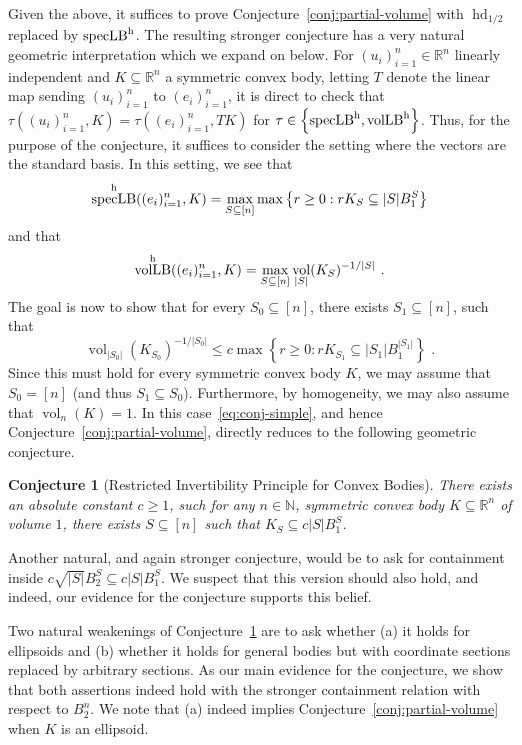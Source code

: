 \documentclass[11pt]{article}
\newtheorem{conjecture}[theorem]{Conjecture}
\newcommand{\R}{{\mathbb{R}}}
\newcommand{\N}{{\mathbb{N}}}
\newcommand{\set}[1]{\left\{ #1 \right\}}
\DeclareMathOperator{\vollb}{volLB}
\DeclareMathOperator{\hd}{hd}
\DeclareMathOperator{\vol}{vol}
\DeclareMathOperator{\speclb}{specLB}
\begin{document}
Given the above, it suffices to prove Conjecture~\ref{conj:partial-volume} with
$\hd_{1/2}$ replaced by $\speclb^{\rm h}$. The resulting stronger conjecture has a
very natural geometric interpretation which we expand on below. For
$(u_i)_{i=1}^n \in \R^n$ linearly independent and $K \subseteq \R^n$ a symmetric
convex body, letting $T$ denote the linear map sending $(u_i)_{i=1}^n$ to
$(e_i)_{i=1}^n$, it is direct to check that $\tau((u_i)_{i=1}^n,K) =
\tau((e_i)_{i=1}^n,TK)$ for $\tau \in \set{\speclb^{\rm h},\vollb^{\rm h}}$.
Thus, for the purpose of the conjecture, it suffices to consider the setting
where the vectors are the standard basis. In this setting, we see that
\[
\speclb^{\rm h}((e_i)_{i=1}^n,K) = \max_{S \subseteq [n]} \max \set{r \geq
0: r K_S \subseteq |S| B_1^S} 
\]
and that 
\[
\vollb^{\rm h}((e_i)_{i=1}^n,K) = \max_{S \subseteq [n]}
\vol_{|S|}(K_S)^{-1/|S|} \text{ .} 
\]
The goal is now to show that for every $S_0 \subseteq [n]$, there exists $S_1
\subseteq [n]$, such that 
\begin{equation}
\label{eq:conj-simple}
\vol_{|S_0|}(K_{S_0})^{-1/|S_0|} \leq c \max \set{r \geq 0: r K_{S_1} \subseteq
|S_1| B_1^{|S_1|}} \text{ .}
\end{equation}
Since this must hold for every symmetric convex body $K$, we may assume that
$S_0 = [n]$ (and thus $S_1 \subseteq S_0$). Furthermore, by homogeneity, we may
also assume that $\vol_n(K)=1$. In this case~\eqref{eq:conj-simple}, and hence
Conjecture~\ref{conj:partial-volume}, directly reduces to the following
geometric conjecture.

\begin{conjecture}[Restricted Invertibility Principle for Convex Bodies]
\label{conj:conv-restr-iso} There exists an absolute constant $c \geq 1$, such
for any $n \in \N$, symmetric convex body $K \subseteq \R^n$ of volume $1$,
there exists $S \subseteq [n]$ such that $K_S \subseteq c |S| B_1^S$.
\end{conjecture}

Another natural, and again stronger conjecture, would be to ask for containment
inside $c \sqrt{|S|} B_2^S \subseteq c |S| B_1^S$. We suspect that this version
should also hold, and indeed, our evidence for the conjecture supports this
belief. 

Two natural weakenings of Conjecture~\ref{conj:conv-restr-iso} are to ask
whether (a) it holds for ellipsoids and (b) whether it holds for general bodies
but with coordinate sections replaced by arbitrary sections. As our main
evidence for the conjecture, we show that both assertions indeed hold with the
stronger containment relation with respect to $B_2^n$. We note that (a) indeed
implies Conjecture~\ref{conj:partial-volume} when $K$ is an ellipsoid.  
\end{document}
